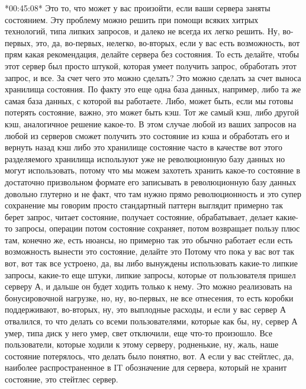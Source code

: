 \documentclass[12pt]{article} %
\begin{document}
*00:45:08*
Это то, что может у вас произойти, если ваши сервера заняты состоянием.  Эту проблему можно решить при помощи всяких хитрых технологий, типа липких запросов, и далеко не всегда их легко решить.  Ну, во-первых, это, да, во-первых, нелегко, во-вторых, если у вас есть возможность, вот прям какая рекомендация, делайте сервера без состояния.  То есть делайте, чтобы этот сервер был просто штукой, которая умеет получить запрос, обработать этот запрос, и все.  За счет чего это можно сделать?  Это можно сделать за счет выноса хранилища состояния.  По факту это еще одна база данных, например, либо та же самая база данных, с которой вы работаете.  Либо, может быть, если мы готовы потерять состояние, важно, это может быть кэш.  Тот же самый кэш, либо другой кэш, аналогичное решение какое-то.  В этом случае любой из ваших запросов на любой из серверов сможет получить это состояние из кэша и обработать его и вернуть назад кэш либо это хранилище состояние часто в качестве вот этого разделяемого хранилища используют уже не революционную базу данных но могут использовать, потому что мы можем захотеть хранить какое-то состояние в достаточно призвольном формате его записывать в революционную базу данных довольно глутерно и не факт, что там нужно прямо революционность и это супер сохранение мы говорим просто стандартный паттерн выглядит примерно так берет запрос, читает состояние, получает состояние, обрабатывает, делает какие-то запросы, операции потом состояние сохраняет, потом возвращает пользу плюс там, конечно же, есть нюансы, но примерно так это обычно работает если есть возможность вынести это состояние, делайте это Потому что пока у вас вот так вот, вот так все устроено, да, вы либо вынуждены использовать какие-то липкие запросы, какие-то еще штуки, липкие запросы, которые от пользователя пришел серверу А, и дальше он будет ходить только к нему.  Это можно реализовать на бонусировочной нагрузке, но, ну, во-первых, не все отнесения, то есть коробки поддерживают, во-вторых, ну, это выплодные расходы, и если у вас сервер А отвалился, то что делать со всеми пользователями, которые как бы, ну, сервер А умер, типа диск у него умер, свет отключили, еще что-то произошло.  Все пользователи, которые ходили к этому серверу, родненькие, ну, жаль, наше состояние потерялось, что делать было понятно, вот.  А если у вас стейтлес, да, наиболее распространенное в IT обозначение для сервера, который не хранит состояние, это стейтлес сервер.
\end{document}
